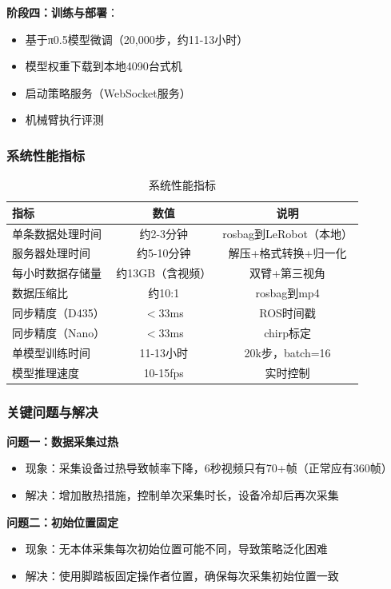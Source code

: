 \textbf{阶段四：训练与部署}：
\begin{itemize}[leftmargin=2em]
    \item 基于π0.5模型微调（20,000步，约11-13小时）
    \item 模型权重下载到本地4090台式机
    \item 启动策略服务（WebSocket服务）
    \item 机械臂执行评测
\end{itemize}

\subsubsection{系统性能指标}

\begin{table}[htbp]
\centering
\caption{系统性能指标}
\label{tab:system_performance}
\begin{tabular}{lcc}
\toprule
指标 & 数值 & 说明 \\
\midrule
单条数据处理时间 & 约2-3分钟 & rosbag到LeRobot（本地） \\
服务器处理时间 & 约5-10分钟 & 解压+格式转换+归一化 \\
每小时数据存储量 & 约13GB（含视频） & 双臂+第三视角 \\
数据压缩比 & 约10:1 & rosbag到mp4 \\
同步精度（D435） & $<$33ms & ROS时间戳 \\
同步精度（Nano） & $<$33ms & chirp标定 \\
单模型训练时间 & 11-13小时 & 20k步，batch=16 \\
模型推理速度 & 10-15fps & 实时控制 \\
\bottomrule
\end{tabular}
\end{table}

\subsubsection{关键问题与解决}

\textbf{问题一：数据采集过热}
\begin{itemize}[leftmargin=2em]
    \item 现象：采集设备过热导致帧率下降，6秒视频只有70+帧（正常应有360帧）
    \item 解决：增加散热措施，控制单次采集时长，设备冷却后再次采集
\end{itemize}

\textbf{问题二：初始位置固定}
\begin{itemize}[leftmargin=2em]
    \item 现象：无本体采集每次初始位置可能不同，导致策略泛化困难
    \item 解决：使用脚踏板固定操作者位置，确保每次采集初始位置一致
\end{itemize}

